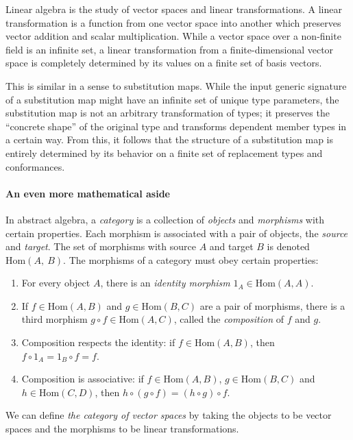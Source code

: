 \documentclass[a4paper,headsepline,bibliography=totoc,toc=flat,fleqn,twoside=semi]{scrbook}
\theoremstyle{definition}
\theoremstyle{definition}
\theoremstyle{definition}
\begin{document}
Linear algebra is the study of vector spaces and linear transformations. A linear transformation is a function from one vector space into another which preserves vector addition and scalar multiplication. While a vector space over a non-finite field is an infinite set, a linear transformation from a finite-dimensional vector space is completely determined by its values on a finite set of basis vectors.

This is similar in a sense to substitution maps. While the input generic signature of a substitution map might have an infinite set of unique type parameters, the substitution map is not an arbitrary transformation of types; it preserves the ``concrete shape'' of the original type and transforms dependent member types in a certain way. From this, it follows that the structure of a substitution map is entirely determined by its behavior on a finite set of replacement types and conformances.

\paragraph{An even more mathematical aside}
In abstract algebra, a \emph{category} is a collection of \emph{objects} and \emph{morphisms} with certain properties. Each morphism is associated with a pair of objects, the \emph{source} and \emph{target}. The set of morphisms with source $A$ and target $B$ is denoted $\mathrm{Hom}(A,~B)$. The morphisms of a category must obey certain properties:
\begin{enumerate}
\item For every object $A$, there is an \emph{identity morphism} $1_A\in\mathrm{Hom}(A, A)$.
\item If $f\in\mathrm{Hom}(A, B)$ and $g\in\mathrm{Hom}(B, C)$ are a pair of morphisms, there is a third morphism $g\circ f\in\mathrm{Hom}(A, C)$, called the \emph{composition} of $f$ and $g$.
\item Composition respects the identity: if $f\in\mathrm{Hom}(A, B)$, then $f\circ 1_A=1_B\circ f=f$.
\item Composition is associative: if $f\in\mathrm{Hom}(A, B)$, $g\in\mathrm{Hom}(B, C)$ and $h\in\mathrm{Hom}(C, D)$, then $h\circ(g\circ f)=(h\circ g)\circ f$.
\end{enumerate}
We can define \emph{the category of vector spaces} by taking the objects to be vector spaces and the morphisms to be linear transformations.
\end{document}
